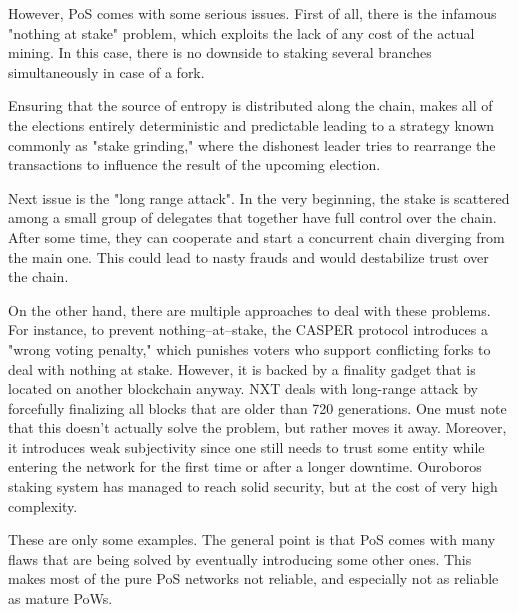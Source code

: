 However, PoS comes with some serious issues. First of all, there is the infamous "nothing at stake"
\cite{pos_flaws_nothing}
problem, which exploits the lack of any cost of the actual mining. In this case,
there is no downside to staking several branches simultaneously in case of a fork.

Ensuring that the source of entropy is distributed along the chain,
makes all of the elections entirely deterministic and predictable leading to a strategy
known commonly as "stake grinding," where the dishonest leader tries to rearrange the
transactions to influence the result of the upcoming election.

Next issue is the "long range attack"\cite{pos_flaws_long}.
In the very beginning, the stake is scattered among a small
group of delegates that together have full control over the chain. After
some time, they can cooperate and start a concurrent chain diverging from
the main one. This could lead to nasty frauds and would
destabilize trust over the chain.

On the other hand, there are multiple approaches to deal with these problems. For instance,
to prevent nothing–at–stake, the CASPER protocol introduces a "wrong voting
penalty," which punishes
voters who support conflicting forks to deal with nothing at stake\cite{casper}.
However, it is backed by a finality gadget that is located on another blockchain
anyway. NXT deals with long-range attack by forcefully
finalizing all blocks that are older than 720 generations\cite{nxt}.
One must note that this doesn't actually solve the problem, but rather moves it
away. Moreover, it introduces weak subjectivity since one still needs to trust
some entity while entering the network for the first time or after a longer
downtime. Ouroboros staking system has managed to reach solid security, but
at the cost of very high complexity\cite{ouroboros}.

These are only some examples. The general point is that PoS comes with many flaws
that are being solved by eventually introducing some other ones. This
makes most of the pure PoS networks not reliable, and especially not as reliable
as mature PoWs.
